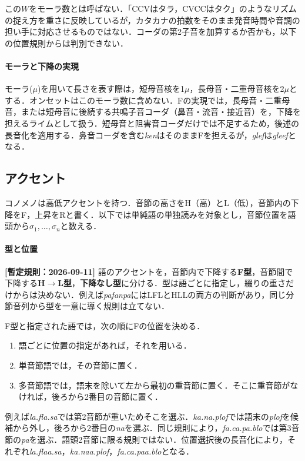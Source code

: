 \documentclass[../../main-detail.tex]{subfiles}
\begin{document}
\begin{remark}
この$W$をモーラ数とは呼ばない．「CCVはタラ，CVCCはタク」のようなリズムの捉え方を重さに反映しているが，カタカナの拍数をそのまま発音時間や音調の担い手に対応させるものではない．コーダの第2子音を加算するか否かも，以下の位置規則からは判別できない．
\end{remark}

\paragraph{モーラと下降の実現}
モーラ($\mu$)を用いて長さを表す際は，短母音核を1$\mu$，長母音・二重母音核を2$\mu$とする．オンセットはこのモーラ数に含めない．Fの実現では，長母音・二重母音，または短母音に後続する共鳴子音コーダ（鼻音・流音・接近音）を，下降を担えるライムとして扱う．短母音と阻害音コーダだけでは不足するため，後述の長音化を適用する．鼻音コーダを含む\textit{ken}はそのままFを担えるが，\textit{glef}は\textit{gleef}となる．


\subsection{アクセント}
コノメノは高低アクセントを持つ．音節の高さをH（高）とL（低），音節内の下降をF，上昇をRと書く．以下では単純語の単独読みを対象とし，音節位置を語頭から$\sigma_1,\ldots,\sigma_n$と数える．

\paragraph{型と位置}
\textbf{[暫定規則：2026-09-11]} 語のアクセントを，音節内で下降する\textbf{F型}，音節間で下降する\textbf{H$\to$L型}，\textbf{下降なし型}に分ける．型は語ごとに指定し，綴りの重さだけからは決めない．例えば\textit{pafanpa}にはLFLとHLLの両方の判断があり，同じ分節音列から型を一意に導く規則は立てない．

\begin{definition}[F型の既定位置]
F型と指定された語では，次の順にFの位置を決める．
\begin{enumerate}
    \item 語ごとに位置の指定があれば，それを用いる．
    \item 単音節語では，その音節に置く．
    \item 多音節語では，語末を除いて左から最初の重音節に置く．そこに重音節がなければ，後ろから2番目の音節に置く．
\end{enumerate}
\end{definition}
例えば\textit{la.fla.sa}では第2音節が重いためそこを選ぶ．\textit{ka.na.plof}では語末の\textit{plof}を候補から外し，後ろから2番目の\textit{na}を選ぶ．同じ規則により，\textit{fa.ca.pa.blo}では第3音節の\textit{pa}を選ぶ．語頭2音節に限る規則ではない．位置選択後の長音化により，それぞれ\textit{la.flaa.sa}，\textit{ka.naa.plof}，\textit{fa.ca.paa.blo}となる．
\end{document}
